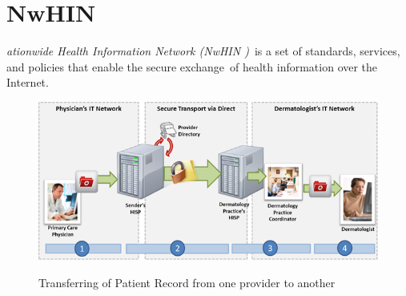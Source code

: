   \section[Nationwide Health Information Network (NwHIN)]{NwHIN}
  \label{sec:nwhin}

  \textit{ationwide Health Information Network (NwHIN )}\
  is a set of standards, services, and policies that enable the secure exchange\
  of health information over the Internet.\citep{_nwhin_framework_2013}     

  \begin{figure}[ht!]
    \centering
    \includegraphics[scale=0.5]{nwhin.png}
    \caption{Transferring of Patient Record from one provider to another}
    \cite[Fig.~1]{_nwhin_frameworkOne_2013}
    \label{fig:nwhin}
  \end{figure}  
